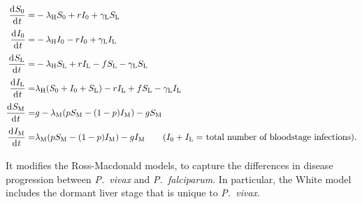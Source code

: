 \begin{align*}
    \frac{\diff S_0}{\diff t}
    = & -\lambda_\mathrm{H} S_0 + rI_0 + \gamma_\mathrm{L}S_\mathrm{L} \\
    \frac{\diff I_0}{\diff t}
    = & -\lambda_\mathrm{H} I_0 - rI_0 + \gamma_\mathrm{L}I_\mathrm{L} \\
    \frac{\diff S_\mathrm{L}}{\diff t}
    = & -\lambda_\mathrm{H} S_\mathrm{L} + rI_\mathrm{L}
    - fS_\mathrm{L} -\gamma_\mathrm{L}S_\mathrm{L}                     \\
    \frac{\diff I_\mathrm{L}}{\diff t}
    = & \lambda_\mathrm{H} (S_0 + I_0 + S_\mathrm{L}) - rI_\mathrm{L}
    + fS_\mathrm{L} -\gamma_\mathrm{L}I_\mathrm{L}                     \\
    \frac{\diff S_\mathrm{M}}{\diff t}
    = & g - \lambda_\mathrm{M}(pS_\mathrm{M}
    - (1 - p)I_\mathrm{M}) - gS_\mathrm{M}                             \\
    \frac{\diff I_\mathrm{M}}{\diff t}
    = & \lambda_\mathrm{M}(pS_\mathrm{M} - (1 - p)I_\mathrm{M})
    - gI_\mathrm{M}
    \tag{$I_0 + I_\mathrm{L}=$ total number of bloodstage infections}.
\end{align*}

It modifies the Ross-Macdonald models, to capture the differences in disease
progression between \textit{P.\ vivax} and \textit{P.\ falciparum}.
In particular, the White model includes the dormant liver stage that is
unique to \textit{P.\ vivax}.


